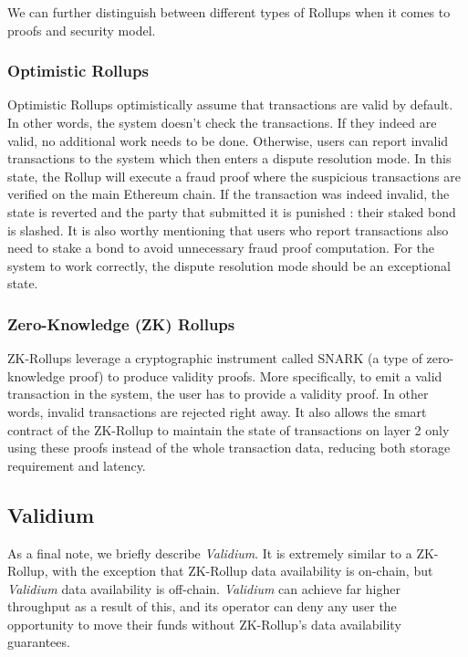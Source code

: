 We can further distinguish between different types of Rollups when it comes to proofs and security model. 
\subsubsection{Optimistic Rollups} 

Optimistic Rollups optimistically assume that transactions are valid by default. In other words, the system doesn't check the transactions. If they indeed are valid, no additional work needs to be done. Otherwise, users can report invalid transactions to the system which then enters a dispute resolution mode. In this state, the Rollup will execute a fraud proof where the suspicious transactions are verified on the main Ethereum chain. If the transaction was indeed invalid, the state is reverted and the party that submitted it is punished : their staked bond is slashed. It is also worthy mentioning that users who report transactions also need to stake a bond to avoid unnecessary fraud proof computation. For the system to work correctly, the dispute resolution mode should be an exceptional state. 
    
\subsubsection{Zero-Knowledge (ZK) Rollups}
ZK-Rollups leverage a cryptographic instrument called SNARK (a type of zero-knowledge proof) to produce validity proofs. More specifically, to emit a valid transaction in the system, the user has to provide a validity proof. In other words, invalid transactions are rejected right away. It also allows the smart contract of the ZK-Rollup to maintain the state of transactions on layer 2 only using these proofs instead of the whole transaction data, reducing both storage requirement and latency.

\subsection{Validium}

As a final note, we briefly describe \textit{Validium}. It is extremely similar to a ZK-Rollup, with the exception that ZK-Rollup data availability is on-chain, but \textit{Validium} data availability is off-chain. \cite{gluchowski_zkrollup_2021} \textit{Validium} can achieve far higher throughput as a result of this, and its operator can deny any user the opportunity to move their funds without ZK-Rollup's data availability guarantees.

